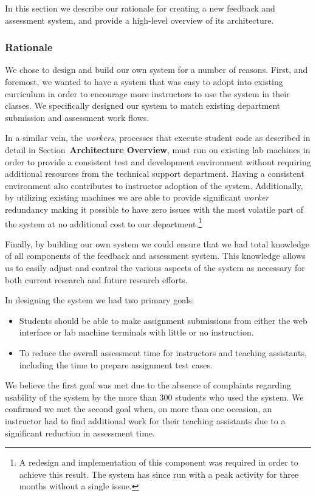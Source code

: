 In this section we describe our rationale for creating a new feedback and
assessment system, and provide a high-level overview of its architecture.

\subsubsection{Rationale}
We chose to design and build our own system for a number of reasons. First, and
foremost, we wanted to have a system that was easy to adopt into existing
curriculum in order to encourage more instructors to use the system in their
classes. We specifically designed our system to match existing department
submission and assessment work flows.

In a similar vein, the \emph{workers}, processes that execute student code as
described in detail in Section~\textbf{Architecture Overview}, must run on
existing lab machines in order to provide a consistent test and development
environment without requiring additional resources from the technical support
department. Having a consistent environment also contributes to instructor
adoption of the system. Additionally, by utilizing existing machines we are
able to provide significant \emph{worker} redundancy making it possible to have
zero issues with the most volatile part of the system at no additional cost to
our department.\footnote{A redesign and implementation of this component was
  required in order to achieve this result. The system has since run with a
  peak activity for three months without a single issue.}

Finally, by building our own system we could ensure that we had total knowledge
of all components of the feedback and assessment system. This knowledge allows
us to easily adjust and control the various aspects of the system as necessary
for both current research and future research efforts.

In designing the system we had two primary goals:

\begin{itemize}
\item Students should be able to make assignment submissions from either the
  web interface or lab machine terminals with little or no instruction.
\item To reduce the overall assessment time for instructors and teaching
  assistants, including the time to prepare assignment test cases.
\end{itemize}

We believe the first goal was met due to the absence of complaints regarding
usability of the system by the more than 300 students who used the system. We
confirmed we met the second goal when, on more than one occasion, an instructor
had to find additional work for their teaching assistants due to a significant
reduction in assessment time.


